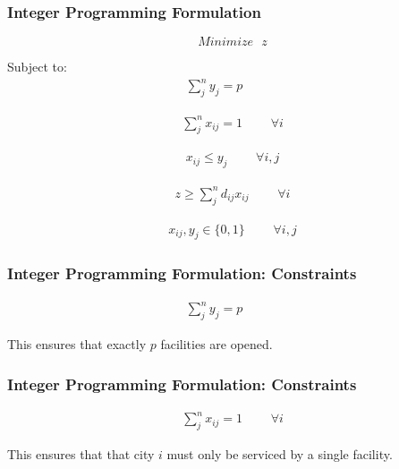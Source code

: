 \documentclass[12pt]{beamer}
\begin{document}
\begin{frame}
\frametitle{Integer Programming Formulation}
$$
Minimize\texttt{ }z
\label{eq:$p$-Center Problem IP Objective Function}
$$

Subject to:
$$
\begin{aligned}
\sum_j^n y_{j} = p & \texttt{     } & \texttt{        }
\end{aligned}
\label{eq:$p$-Center Problem IP Facility Count Constraint}
$$

$$
\begin{aligned}
\sum_j^n x_{ij} = 1 & \texttt{     } & \forall i
\end{aligned}
\label{eq:$p$-Center Problem IP City-Facility Assignment Constraint}
$$

$$
\begin{aligned}
x_{ij} \leq y_j & \texttt{     } & \forall i,j
\end{aligned}
\label{eq:$p$-Center Problem IP Open Facility Constraint}
$$

$$
\begin{aligned}
z \geq \sum_j^n d_{ij}x_{ij} & \texttt{     } & \forall i
\end{aligned}
\label{eq:$p$-Center Problem IP Largest Possible Z-value}
$$

$$
\begin{aligned}
x_{ij},y_j \in \{0,1\} & \texttt{     } & \forall i,j
\end{aligned}
\label{eq:$p$-Center Problem IP Integer 0-1 Constraint}
$$

\end{frame}

\begin{frame}
\frametitle{Integer Programming Formulation: Constraints}
$$
\begin{aligned}
\sum_j^n y_{j} = p & \texttt{     } & \texttt{        }
\end{aligned}
\label{eq:$p$-Center Problem IP Facility Count Constraint}
$$
\begin{center}
This ensures that exactly $p$ facilities are opened.
\end{center}
\end{frame}

\begin{frame}
\frametitle{Integer Programming Formulation: Constraints}
$$
\begin{aligned}
\sum_j^n x_{ij} = 1 & \texttt{     } & \forall i
\end{aligned}
\label{eq:$p$-Center Problem IP City-Facility Assignment Constraint}
$$
\begin{center}
This ensures that that city $i$ must only be serviced by a single facility.
\end{center}
\end{frame}
\end{document}

